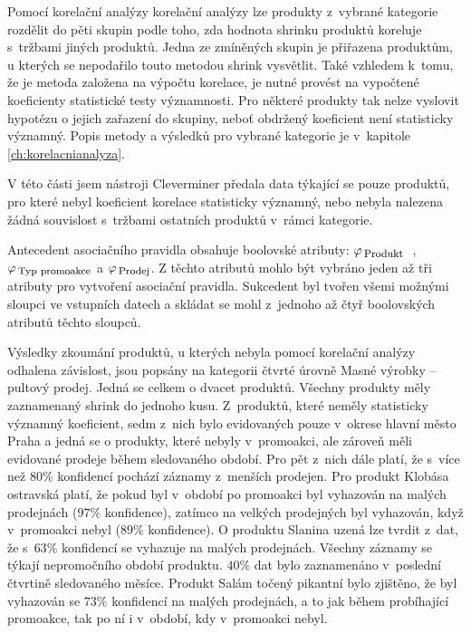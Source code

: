 Pomocí korelační analýzy korelační analýzy lze produkty z~vybrané kategorie rozdělit do pěti skupin podle toho, zda hodnota shrinku produktů koreluje s~tržbami jiných produktů. Jedna ze zmíněných skupin je přiřazena produktům, u kterých se nepodařilo touto metodou shrink vysvětlit. Také vzhledem k~tomu, že je metoda založena na výpočtu korelace, je nutné provést na vypočtené koeficienty statistické testy významnosti. Pro některé produkty tak nelze vyslovit hypotézu o jejich zařazení do skupiny, neboť obdržený koeficient není statisticky významný. Popis metody a výsledků pro vybrané kategorie je v~kapitole \ref*{ch:korelacnianalyza}.

V této části jsem nástroji Cleverminer předala data týkající se pouze produktů, pro které nebyl koeficient korelace statisticky významný, nebo nebyla nalezena žádná souvislost s~tržbami ostatních produktů v~rámci kategorie.

Antecedent asociačního pravidla obsahuje boolovské atributy: 
$    \varphi_{\mbox{\,\footnotesize Produkt }}      $ , 
$    \varphi_{\mbox{\,\footnotesize Typ promoakce}} $ a 
$    \varphi_{\mbox{\,\footnotesize Prodej}}$. 
Z těchto atributů mohlo být vybráno jeden až tři atributy pro vytvoření asociační pravidla. Sukcedent byl tvořen všemi možnými sloupci ve vstupních datech a skládat se mohl z~jednoho až čtyř boolovských atributů těchto sloupců.

Výsledky zkoumání produktů, u kterých nebyla pomocí korelační analýzy odhalena závislost, jsou popsány na kategorii čtvrté úrovně Masné výrobky -- pultový prodej. Jedná se celkem o dvacet produktů.
Všechny produkty měly zaznamenaný shrink do jednoho kusu. 
Z~produktů, které neměly statisticky významný koeficient, sedm z~nich bylo evidovaných pouze v~okrese hlavní město Praha a jedná se o produkty, které nebyly v~promoakci, ale zároveň měli evidované prodeje během sledovaného období. Pro pět z~nich dále platí, že s~více než $80\%$ konfidencí pochází záznamy z~menších prodejen.
Pro produkt Klobása ostravská platí, že pokud byl v~období po promoakci byl vyhazován na malých prodejnách ($97\%$ konfidence), zatímco na velkých prodejných byl vyhazován, když v~promoakci nebyl ($89\%$ konfidence). 
O produktu Slanina uzená lze tvrdit z~dat, že s~$63\%$ konfidencí se vyhazuje na malých prodejnách. Všechny záznamy se týkají nepromočního období produktu. $40\%$ dat bylo zaznamenáno v~poslední čtvrtině sledovaného měsíce. 
Produkt Salám točený pikantní bylo zjištěno, že byl vyhazován se $ 73\%$ konfidencí na malých prodejnách, a to jak během probíhající promoakce, tak po ní  i v~období, kdy v~promoakci nebyl. 

